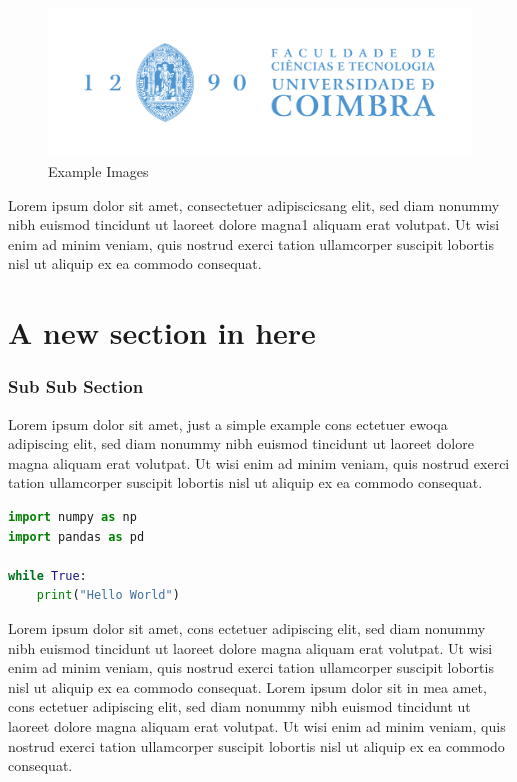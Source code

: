 \begin{figure}[H]
    \centering
    \includegraphics[width=0.5\linewidth]{images/UC_logos/FCTUC_V_FundoClaro.png}
    \caption{Example Images \cite{ExampleArticle}}
    \label{fig: sample image}
\end{figure}

Lorem ipsum dolor sit amet, consectetuer adipiscicsang elit, sed diam nonummy nibh euismod tincidunt ut laoreet dolore magna1 aliquam erat volutpat. Ut wisi enim ad minim veniam, quis nostrud exerci tation ullamcorper suscipit lobortis nisl ut aliquip ex ea commodo consequat.

\section{A new section in here}

\subsubsection{Sub Sub Section}

Lorem ipsum dolor sit amet, just a simple example cons ectetuer ewoqa adipiscing elit, sed diam nonummy nibh euismod tincidunt ut laoreet dolore magna aliquam erat volutpat. Ut wisi enim ad minim veniam, quis nostrud exerci tation ullamcorper suscipit lobortis nisl ut aliquip ex ea commodo consequat.


\begin{lstlisting}[language=Python, caption= Sample code listing, label=lst: sample code,frame=tb]
import numpy as np 
import pandas as pd

while True:
    print("Hello World")
\end{lstlisting}

Lorem ipsum dolor sit amet, cons ectetuer adipiscing elit, sed diam nonummy nibh euismod tincidunt ut laoreet dolore magna aliquam erat volutpat. Ut wisi enim ad minim veniam, quis nostrud exerci tation ullamcorper suscipit lobortis nisl ut aliquip ex ea commodo consequat.
Lorem ipsum dolor sit in mea amet, cons ectetuer adipiscing elit, sed diam nonummy nibh euismod tincidunt ut laoreet dolore magna aliquam erat volutpat. Ut wisi enim ad minim veniam, quis nostrud exerci tation ullamcorper suscipit lobortis nisl ut aliquip ex ea commodo consequat.